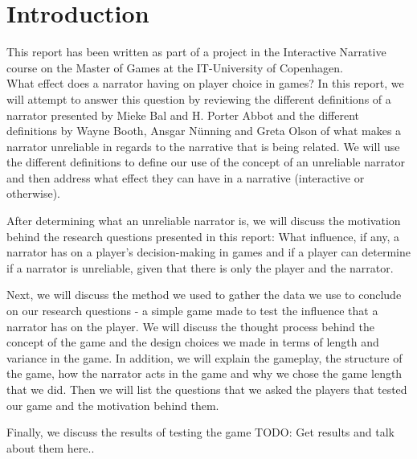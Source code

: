 \section{Introduction}
\label{Introduction}

This report has been written as part of a project in the Interactive Narrative course on the Master of Games at the IT-University of Copenhagen.\\

What effect does a narrator having on player choice in games? In this report, we will attempt to answer this question by reviewing the different definitions of a narrator presented by Mieke Bal and H. Porter Abbot and the different definitions by Wayne Booth, Ansgar N\"unning and Greta Olson of what makes a narrator unreliable in regards to the narrative that is being related. We will use the different definitions to define our use of the concept of an unreliable narrator and then address what effect they can have in a narrative (interactive or otherwise).

After determining what an unreliable narrator is, we will discuss the motivation behind the research questions presented in this report: What influence, if any, a narrator has on a player's decision-making in games and if a player can determine if a narrator is unreliable, given that there is only the player and the narrator. 

Next, we will discuss the method we used to gather the data we use to conclude on our research questions - a simple game made to test the influence that a narrator has on the player. We will discuss the thought process behind the concept of the game and the design choices we made in terms of length and variance in the game. In addition, we will explain the gameplay, the structure of the game, how the narrator acts in the game and why we chose the game length that we did. Then we will list the questions that we asked the players that tested our game and the motivation behind them.

Finally, we discuss the results of testing the game TODO: Get results and talk about them here..